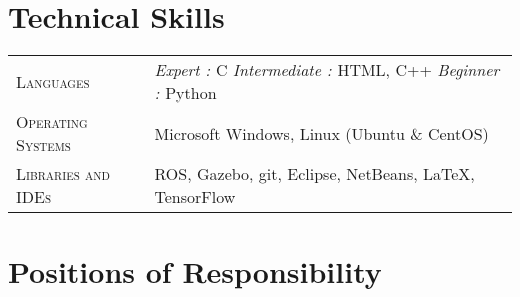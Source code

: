 \documentclass[a4paper,11pt]{extarticle} %
\begin{document}
\begin{tabular}{R{3.5cm}|p{14.5cm}}
\end{tabular}


\section{Technical Skills}

\begin{tabular}{R{3.5cm}|p{14.5cm}}
\textsc{Languages} & {\itshape{Expert : }}C {\itshape{Intermediate : }} HTML, C++  {\itshape{Beginner : }}Python \\
\textsc{Operating Systems} &  Microsoft Windows, Linux (Ubuntu \& CentOS)\\
\textsc{Libraries and IDEs} & ROS, Gazebo, git, Eclipse, NetBeans, LaTeX, TensorFlow\\
\end{tabular}


\section{Positions of Responsibility}
\end{document}
